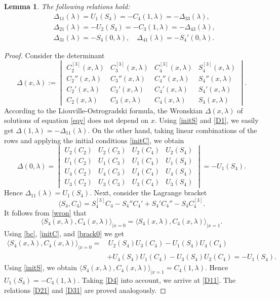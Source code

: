 \documentclass[a4paper,12pt]{article}
\newcommand{\la}{\lambda}
\theoremstyle{plain}
\numberwithin{equation}{section}
\newtheorem{lem}[thm]{Lemma}
\theoremstyle{definition}
\theoremstyle{remark}
\begin{document}
\begin{lem} \label{lem:aux1}
The following relations hold:
\begin{align} \label{D11}
& \Delta_{11}(\la) = U_1(S_4) = -C_4(1, \la) = -\Delta_{33}(\la), \\ \label{D21}
& \Delta_{21}(\la) = -U_2(S_4) = -C_3(1,\la) = -\Delta_{43}(\la), \\ \label{D31}
& \Delta_{31}(\la) = -S_4(0, \la), \quad \Delta_{41}(\la) = -S_4'(0, \la).
\end{align}
\end{lem}

\begin{proof}
Consider the determinant
$$
\Delta(x, \la) := \begin{vmatrix}
                     C_2^{[3]}(x, \la) & C_3^{[3]}(x, \la) & C_4^{[3]}(x, \la) & S_4^{[3]}(x, \la) \\
                     C_2''(x, \la) & C_3''(x, \la) & C_4''(x, \la) & S_4''(x, \la) \\
                     C_2'(x, \la) & C_3'(x, \la) & C_4'(x, \la) & S_4'(x, \la) \\
                     C_2(x, \la) & C_3(x, \la) & C_4(x, \la) & S_4(x, \la)       
                  \end{vmatrix}.
$$
According to the Liouville-Ostrogradski formula, the Wronskian $\Delta(x, \la)$ of solutions of equation \eqref{eqv} does not depend on $x$. Using \eqref{initS} and \eqref{D1}, we easily get $\Delta(1, \la) = -\Delta_{11}(\la)$. On the other hand, taking linear combinations of the rows and applying the initial conditions \eqref{initC}, we obtain
$$
\Delta(0, \la) = \begin{vmatrix}
                     U_2(C_2) & U_2(C_3) & U_2(C_4) & U_2(S_4) \\
                     U_1(C_2) & U_1(C_3) & U_1(C_4) & U_1(S_4) \\
                     U_4(C_2) & U_4(C_3) & U_4(C_4) & U_4(S_4) \\
                     U_3(C_2) & U_3(C_3) & U_3(C_4) & U_3(S_4)
                  \end{vmatrix} = -U_1(S_4).
$$
Hence $\Delta_{11}(\la) = U_1(S_4)$. Next, consider the Lagrange bracket
$$
\langle S_4, C_4 \rangle = S_4^{[3]} C_4 - S_4'' C_4' + S_4' C_4'' - S_4 C_4^{[3]}.
$$
It follows from \eqref{wron} that 
$$
\langle S_4(x, \la), C_4(x, \la) \rangle_{|x = 0} = \langle S_4(x, \la), C_4(x, \la) \rangle_{|x = 1}.
$$
Using \eqref{bc}, \eqref{initC}, and \eqref{brack0} we get
\begin{align*}
\langle S_4(x, \la), C_4(x, \la) \rangle_{|x = 0} = & \, U_2(S_4) U_3(C_4) - U_1(S_4) U_4(C_4) \\ & + U_4(S_4) U_1(C_4) - U_3(S_4) U_2(C_4) = -U_1(S_4).
\end{align*}
Using \eqref{initS}, we obtain $\langle S_4(x, \la), C_4(x, \la) \rangle_{|x = 1} = C_4(1,\la)$. Hence $U_1(S_4) = -C_4(1,\la)$. Taking \eqref{D4} into account, we arrive at \eqref{D11}. The relations \eqref{D21} and \eqref{D31} are proved analogously.
\end{proof}
\end{document}
